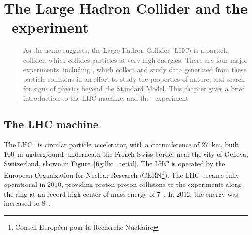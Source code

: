 \chapter[The LHC and the \atlas\ experiment][The LHC and \atlas]
        {The Large Hadron Collider and the \atlas\ experiment}
\label{ch:lhc}

\begin{quote}
  As the name suggests, the Large Hadron Collider (LHC) is a particle collider,
  which collides particles at very high energies.
  There are four major experiments, including \atlas, which collect and study
  data generated from these particle collisions in an effort to study
  the properties of nature, and search for signs of physics beyond the Standard
  Model.
  This chapter gives a brief introduction to the LHC machine, and the
  \atlas\ experiment.
\end{quote}

\FloatBarrier
\section{The LHC machine}
\label{sec:lhc}

The LHC~\cite{cern-jinst-lhc} is circular particle accelerator, with a
circumference of 27~km, built 100~m underground, underneath the French-Swiss
border near the city of Geneva, Switzerland, shown in
Figure~\ref{fig:lhc_aerial}.
The LHC is operated by the European Organization for Nuclear Research
(CERN\footnote{Conseil Europ\'een pour la Recherche Nucl\'eaire}).
The LHC became fully operational in 2010, providing proton-proton collisions
to the experiments along the ring at an record high center-of-mass energy
of 7~\TeV.
In 2012, the energy was increased to 8~\TeV.

